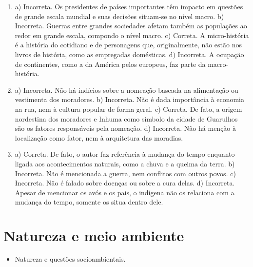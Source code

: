 \begin{enumerate}

\item
a) Incorreta. Os presidentes de países importantes têm impacto em
questões de grande escala mundial e suas decisões situam-se no nível
macro.
b) Incorreta. Guerras entre grandes sociedades afetam também as
populações ao redor em grande escala, compondo o nível macro.
c) Correta. A micro-história é a história do cotidiano e de personagens
que, originalmente, não estão nos livros de história, como as empregadas
domésticas.
d) Incorreta. A ocupação de continentes, como a da América pelos
europeus, faz parte da macro-história.

\item
a) Incorreta. Não há indícios sobre a nomeação baseada na alimentação ou vestimenta dos moradores.
b) Incorreta. Não é dada importância à economia na rua, nem à cultura popular de forma geral.
c) Correta. De fato, a origem nordestina dos moradores e Inhuma como símbolo da cidade de Guarulhos são os fatores responsáveis pela
nomeação.
d) Incorreta. Não há menção à localização como fator, nem à arquitetura
das moradias.

\item
a) Correta. De fato, o autor faz referência à mudança do tempo enquanto
ligada aos acontecimentos naturais, como a chuva e a queima da terra.
b) Incorreta. Não é mencionada a guerra, nem conflitos com outros
povos.
c) Incorreta. Não é falado sobre doenças ou sobre a cura delas.
d) Incorreta. Apesar de mencionar os avós e os pais, o indígena não os
relaciona com a mudança do tempo, somente os situa dentro dele.
\end{enumerate}

\chapter{Natureza e meio ambiente}



\begin{itemize}
\item Natureza e questões socioambientais.
\end{itemize}

